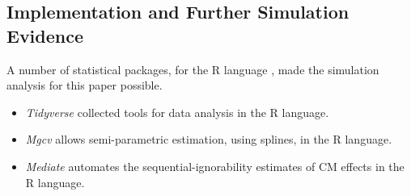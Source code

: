 
\subsection{Implementation and Further Simulation Evidence}
\label{appendix:implement}
A number of statistical packages, for the R language \citep{R2023}, made the simulation analysis for this paper possible.
\begin{itemize}
    \item \textit{Tidyverse} \citep{tidyverse} collected tools for data analysis in the R language.
    \item \textit{Mgcv} \citep{wood2016mgcv} allows semi-parametric estimation, using splines, in the R language.
    \item \textit{Mediate} \citep{tingley2014mediation} automates the sequential-ignorability estimates of CM effects \citep{imai2010identification} in the R language.
\end{itemize}

